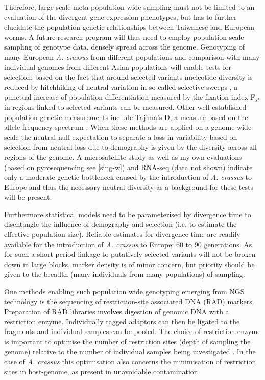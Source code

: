 \documentclass[10pt]{article}
\begin{document}
Therefore, large scale meta-population wide sampling must not be
limited to an evaluation of the divergent gene-expression phenotypes,
but has to further elucidate the population genetic relationships
between Taiwanese and European worms. A future research program will
thus need to employ population-scale sampling of genotype data, densely
spread across the genome. Genotyping of many European
\textit{A. crassus} from different populations and comparison with
many individual genomes from different Asian populations will enable
tests for selection: based on the fact that around selected variants
nucleotide diversity is reduced by hitchhiking of neutral variation in
so called selective sweeps \cite{pmid16251466}, a punctual increase of
population differentiation measured by the fixation index F$_{st}$
\cite{wright1949genetical} in regions linked to selected variants can
be measured. Other well established population genetic measurements
include Tajima's D, a measure based on the allele frequency spectrum
\cite{pmid2513255}. When these methods are applied on a genome wide
scale the neutral null-expectation to separate a loss in variability
based on selection from neutral loss due to demography is given by the
diversity across all regions of the genome. A microsatellite study
\cite{wielgoss_population_2008} as well as my own evaluations (based
on pyrosequencing see \ref{sing-w}) and RNA-seq (data not shown)
indicate only a moderate genetic bottleneck caused by the introduction
of \textit{A. crassus} to Europe and thus the necessary neutral
diversity as a background for these tests will be present.

Furthermore statistical models need to be parameterised by divergence
time to disentangle the influence of demography and selection (i.e. to
estimate the effective population size). Reliable estimates for
divergence time are readily available for the introduction of
\textit{A. crassus} to Europe: 60 to 90 generations. As for such a
short period linkage to putatively selected variants will not be
broken down in large blocks, marker density is of minor concern, but
priority should be given to the breadth (many individuals from many
populations) of sampling.

One methods enabling such population wide genotyping emerging from NGS
technology is the sequencing of restriction-site associated DNA (RAD)
markers. Preparation of RAD libraries involves digestion of genomic
DNA with a restriction enzyme. Individually tagged adaptors can then
be ligated to the fragments and individual samples can be pooled. The
choice of restriction enzyme is important to optimise the number of
restriction sites (depth of sampling the genome) relative to the
number of individual samples being investigated
\cite{pmid18852878}. In the case of \textit{A. crassus} this
optimisation also concerns the minimisation of restriction sites in
host-genome, as present in unavoidable contamination. 
\end{document}
